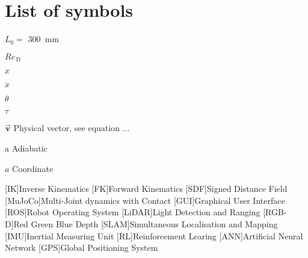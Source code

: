 \chapter{List of symbols}

\begin{Nomencl}[1cm]
    \item[$L_0 = $] \qty{300}{mm}

    \item[$\mathit{Re}_\mathrm{\,D}$]
    \item[$x$]         
    \item[$\ddot{x}$]  \\
    
    \item[$\theta$]    
    \item[$\tau$]      

    \item[$\overrightarrow{\bm{v}}$] Physical vector, see equation ...

    \item[$\mathrm{a}$] Adiabatic
    \item[$a$]          Coordinate

\end{Nomencl}

    \begin{acronym}[MMIIII]
        [IK]{Inverse Kinematics}
        [FK]{Forward Kinematics}
        [SDF]{Signed Distance Field}
        [MuJoCo]{Multi-Joint dynamics with Contact}
        [GUI]{Graphical User Interface}
        [ROS]{Robot Operating System}
        [LiDAR]{Light Detection and Ranging}
        [RGB-D]{Red Green Blue Depth}
        [SLAM]{Simultaneous Localisation and Mapping}
        [IMU]{Inertial Measuring Unit}
        [RL]{Reinforcement Learing}
        [ANN]{Artificial Neural Network}
        [GPS]{Global Positioning System}
    \end{acronym}    

